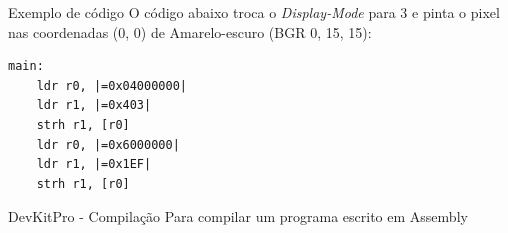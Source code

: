 \documentclass{beamer}
\begin{document}
\begin{darkframes}
    \begin{frame}[fragile]{Exemplo de código}
        O código abaixo troca o \textit{Display-Mode} para 3 e pinta o pixel
        nas coordenadas (0, 0) de Amarelo-escuro (BGR 0, 15, 15):

        \begin{verbatim}
main:
    ldr r0, |=0x04000000|
    ldr r1, |=0x403|
    strh r1, [r0]
    ldr r0, |=0x6000000|
    ldr r1, |=0x1EF|
    strh r1, [r0]
        \end{verbatim}
\end{frame}

    \begin{frame}{DevKitPro - Compilação}
        Para compilar um programa escrito em Assembly
    \end{frame}

\end{darkframes}
\end{document}
